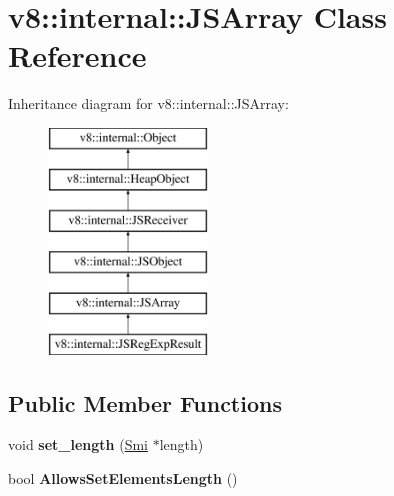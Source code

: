 \hypertarget{classv8_1_1internal_1_1_j_s_array}{}\section{v8\+:\+:internal\+:\+:J\+S\+Array Class Reference}
\label{classv8_1_1internal_1_1_j_s_array}
Inheritance diagram for v8\+:\+:internal\+:\+:J\+S\+Array\+:\begin{figure}[H]
\begin{center}
\leavevmode
\includegraphics[height=6.000000cm]{classv8_1_1internal_1_1_j_s_array}
\end{center}
\end{figure}
\subsection*{Public Member Functions}
\begin{DoxyCompactItemize}
\item 
\hypertarget{classv8_1_1internal_1_1_j_s_array_a161cb54446d5b70543257297463c72ab}{}void {\bfseries set\+\_\+length} (\hyperlink{classv8_1_1internal_1_1_smi}{Smi} $\ast$length)\label{classv8_1_1internal_1_1_j_s_array_a161cb54446d5b70543257297463c72ab}

\item 
\hypertarget{classv8_1_1internal_1_1_j_s_array_a75e4d837231695d82a294bd73b74abde}{}bool {\bfseries Allows\+Set\+Elements\+Length} ()\label{classv8_1_1internal_1_1_j_s_array_a75e4d837231695d82a294bd73b74abde}

\end{DoxyCompactItemize}

